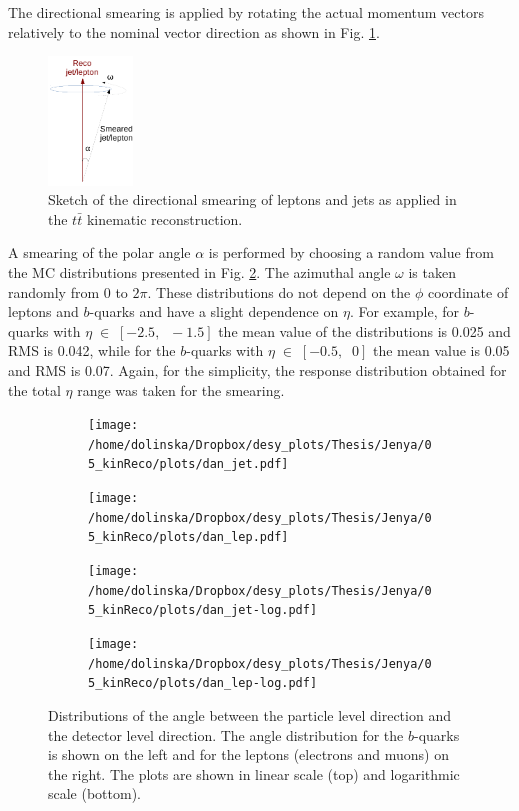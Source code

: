 The directional smearing is applied by rotating the actual momentum vectors relatively to the nominal vector direction
as shown in Fig. \ref{fig:angleRot}. 
\begin{figure}[H]
 \centering
 \includegraphics[width=0.2\textwidth]{05_kinReco/plots/angle_rot.pdf}
 \caption{Sketch of the directional smearing of leptons and jets as applied in the $t\bar{t}$ kinematic reconstruction.}
 \label{fig:angleRot}
\end{figure}

A smearing of the polar angle $\alpha$ is performed by choosing a random value from
the MC distributions presented in Fig. \ref{fig:dAngle}. The azimuthal angle $\omega$ is taken randomly from 0 to $2\pi$.
These distributions do not depend on the $\phi$ coordinate of leptons and $b$-quarks and have a slight dependence on $\eta$. For
example, for $b$-quarks with $\eta\;\in\;[-2.5,\;\;-1.5]$ the mean value of the distributions is 0.025 and RMS is 0.042,
while for the $b$-quarks with $\eta\;\in\;[-0.5,\;\;0]$ the mean value is 0.05 and RMS is 0.07. Again, for the simplicity, the
response distribution obtained for the total $\eta$ range was taken for the smearing.

\begin{figure}[t]
\centering
\begin{subfigure}
  \centering
  \texttt{[image: /home/dolinska/Dropbox/desy\_plots/Thesis/Jenya/05\_kinReco/plots/dan\_jet.pdf]}
\end{subfigure}
\begin{subfigure}
  \centering
  \texttt{[image: /home/dolinska/Dropbox/desy\_plots/Thesis/Jenya/05\_kinReco/plots/dan\_lep.pdf]}
\end{subfigure}
\begin{subfigure}
  \centering
  \texttt{[image: /home/dolinska/Dropbox/desy\_plots/Thesis/Jenya/05\_kinReco/plots/dan\_jet-log.pdf]}
\end{subfigure}
\begin{subfigure}
  \centering
  \texttt{[image: /home/dolinska/Dropbox/desy\_plots/Thesis/Jenya/05\_kinReco/plots/dan\_lep-log.pdf]}
\end{subfigure}
\caption{Distributions of the angle between the particle level direction and the detector level direction.
The angle distribution for the $b$-quarks is shown on the left and for the leptons (electrons and muons) on the right.
The plots are shown in linear scale (top) and logarithmic scale (bottom).}
\label{fig:dAngle}
\end{figure}


